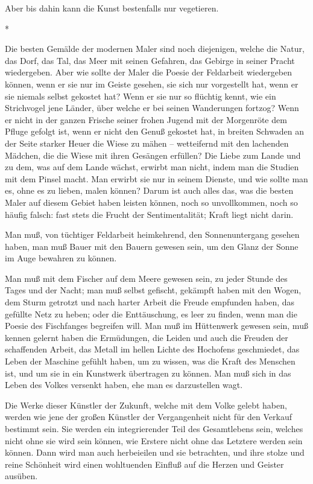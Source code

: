 \documentclass{scrbook}
\begin{document}
Aber bis dahin kann die Kunst bestenfalls nur vegetieren.

\begin{center}*\end{center}

Die besten Gemälde der modernen Maler sind noch diejenigen, welche die Natur, das Dorf, das Tal, das Meer mit seinen Gefahren, das Gebirge in seiner Pracht wiedergeben. Aber wie sollte der Maler die Poesie der Feldarbeit wiedergeben können, wenn er sie nur im Geiste gesehen, sie sich nur vorgestellt hat, wenn er sie niemals selbst gekostet hat? Wenn er sie nur so flüchtig kennt, wie ein Strichvogel jene Länder, über welche er bei seinen Wanderungen fortzog? Wenn er nicht in der ganzen Frische seiner frohen Jugend mit der Morgenröte dem Pfluge gefolgt ist, wenn er nicht den Genuß gekostet hat, in breiten Schwaden an der Seite starker Heuer die Wiese zu mähen – wetteifernd mit den lachenden Mädchen, die die Wiese mit ihren Gesängen erfüllen? Die Liebe zum Lande und zu dem, was auf dem Lande wächst, erwirbt man nicht, indem man die Studien mit dem Pinsel macht. Man erwirbt sie nur in seinem Dienste, und wie sollte man es, ohne es zu lieben, malen können? Darum ist auch alles das, was die besten Maler auf diesem Gebiet haben leisten können, noch so unvollkommen, noch so häufig falsch: fast stets die Frucht der Sentimentalität; Kraft liegt nicht darin.

Man muß, von tüchtiger Feldarbeit heimkehrend, den Sonnenuntergang gesehen haben, man muß Bauer mit den Bauern gewesen sein, um den Glanz der Sonne im Auge bewahren zu können.

Man muß mit dem Fischer auf dem Meere gewesen sein, zu jeder Stunde des Tages und der Nacht; man muß selbst gefischt, gekämpft haben mit den Wogen, dem Sturm getrotzt und nach harter Arbeit die Freude empfunden haben, das gefüllte Netz zu heben; oder die Enttäuschung, es leer zu finden, wenn man die Poesie des Fischfanges begreifen will. Man muß im Hüttenwerk gewesen sein, muß kennen gelernt haben die Ermüdungen, die Leiden und auch die Freuden der schaffenden Arbeit, das Metall im hellen Lichte des Hochofens geschmiedet, das Leben der Maschine gefühlt haben, um zu wissen, was die Kraft des Menschen ist, und um sie in ein Kunstwerk übertragen zu können. Man muß sich in das Leben des Volkes versenkt haben, ehe man es darzustellen wagt.

Die Werke dieser Künstler der Zukunft, welche mit dem Volke gelebt haben, werden wie jene der großen Künstler der Vergangenheit nicht für den Verkauf bestimmt sein. Sie werden ein integrierender Teil des Gesamtlebens sein, welches nicht ohne sie wird sein können, wie Erstere nicht ohne das Letztere werden sein können. Dann wird man auch herbeieilen und sie betrachten, und ihre stolze und reine Schönheit wird einen wohltuenden Einfluß auf die Herzen und Geister ausüben.
\end{document}
